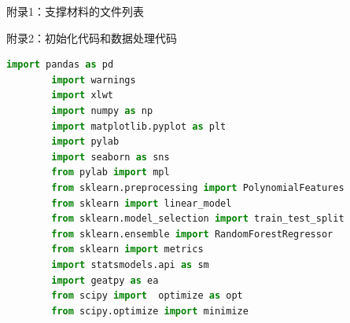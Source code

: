 \documentclass[15.75pt,a4paper]{ctexbook}
\theoremstyle{definition}
\begin{document}
	附录1：支撑材料的文件列表
 
	
	附录2：初始化代码和数据处理代码
	\begin{lstlisting}[language=python,columns=fullflexible,frame=shadowbox]
		import pandas as pd
		import warnings
		import xlwt
		import numpy as np
		import matplotlib.pyplot as plt
		import pylab
		import seaborn as sns
		from pylab import mpl
		from sklearn.preprocessing import PolynomialFeatures
		from sklearn import linear_model
		from sklearn.model_selection import train_test_split
		from sklearn.ensemble import RandomForestRegressor
		from sklearn import metrics
		import statsmodels.api as sm
		import geatpy as ea
		from scipy import  optimize as opt
		from scipy.optimize import minimize
	\end{lstlisting}
	
\end{document}
